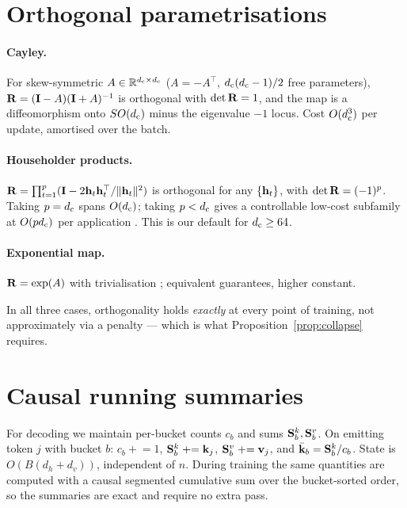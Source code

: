 \section{Orthogonal parametrisations}
\label{app:orth}

\paragraph{Cayley.} For skew-symmetric $A \in \mathbb{R}^{d_{\mathrm{c}}\times d_{\mathrm{c}}}$ ($A = -A^\top$, $d_{\mathrm{c}}(d_{\mathrm{c}}-1)/2$ free parameters), $\mathbf{R} = (\mathbf{I} - A)(\mathbf{I}+A)^{-1}$ is orthogonal with $\det \mathbf{R} = 1$, and the map is a diffeomorphism onto $SO(d_{\mathrm{c}})$ minus the eigenvalue $-1$ locus. Cost $O(d_{\mathrm{c}}^3)$ per update, amortised over the batch.

\paragraph{Householder products.} $\mathbf{R} = \prod_{t=1}^{p} (\mathbf{I} - 2\mathbf{h}_t\mathbf{h}_t^\top/\|\mathbf{h}_t\|^2)$ is orthogonal for any $\{\mathbf{h}_t\}$, with $\det \mathbf{R} = (-1)^p$. Taking $p = d_{\mathrm{c}}$ spans $O(d_{\mathrm{c}})$; taking $p < d_{\mathrm{c}}$ gives a controllable low-cost subfamily at $O(pd_{\mathrm{c}})$ per application \citep{mhammedi2017householder}. This is our default for $d_{\mathrm{c}} \ge 64$.

\paragraph{Exponential map.} $\mathbf{R} = \exp(A)$ with trivialisation \citep{lezcano2019trivializations,arjovsky2016unitary}; equivalent guarantees, higher constant.

In all three cases, orthogonality holds \emph{exactly} at every point of training, not approximately via a penalty --- which is what Proposition~\ref{prop:collapse} requires.

\section{Causal running summaries}
\label{app:summaries}

For decoding we maintain per-bucket counts $c_b$ and sums $\mathbf{S}^k_b, \mathbf{S}^v_b$. On emitting token $j$ with bucket $b$: $c_b \mathrel{+}= 1$, $\mathbf{S}^k_b \mathrel{+}= \mathbf{k}_j$, $\mathbf{S}^v_b \mathrel{+}= \mathbf{v}_j$, and $\bar{\mathbf{k}}_b = \mathbf{S}^k_b/c_b$. State is $O(B(d_h + d_v))$, independent of $n$. During training the same quantities are computed with a causal segmented cumulative sum over the bucket-sorted order, so the summaries are exact and require no extra pass.


